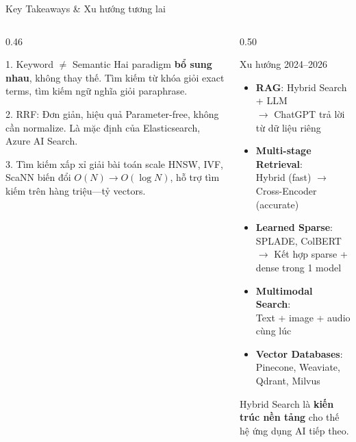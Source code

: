 \documentclass[aspectratio=169, 11pt]{beamer}
\begin{document}
\begin{frame}{Key Takeaways \& Xu hướng tương lai}
\begin{columns}[T]
\begin{column}{0.46\textwidth}

\begin{exampleblock}{1. Keyword $\neq$ Semantic}
{\scriptsize Hai paradigm \textbf{bổ sung nhau}, không thay thế. Tìm kiếm từ khóa giỏi exact terms, tìm kiếm ngữ nghĩa giỏi paraphrase.}
\end{exampleblock}

\vspace{0.05cm}

\begin{exampleblock}{2. RRF: Đơn giản, hiệu quả}
{\scriptsize Parameter-free, không cần normalize. Là mặc định của Elasticsearch, Azure AI Search.}
\end{exampleblock}

\vspace{0.05cm}

\begin{exampleblock}{3. Tìm kiếm xấp xỉ giải bài toán scale}
{\scriptsize HNSW, IVF, ScaNN biến đổi $O(N) \to O(\log N)$, hỗ trợ tìm kiếm trên hàng triệu---tỷ vectors.}
\end{exampleblock}

\end{column}
\begin{column}{0.50\textwidth}

\begin{block}{Xu hướng 2024--2026}
\begin{itemize}
    \item \textbf{RAG}: Hybrid Search + LLM\\
    {\scriptsize$\to$ ChatGPT trả lời từ dữ liệu riêng}
    \item \textbf{Multi-stage Retrieval}:\\
    {\scriptsize Hybrid (fast) $\to$ Cross-Encoder (accurate)}
    \item \textbf{Learned Sparse}: SPLADE, ColBERT\\
    {\scriptsize$\to$ Kết hợp sparse + dense trong 1 model}
    \item \textbf{Multimodal Search}:\\
    {\scriptsize Text + image + audio cùng lúc}
    \item \textbf{Vector Databases}:\\
    {\scriptsize Pinecone, Weaviate, Qdrant, Milvus}
\end{itemize}
\end{block}

\vspace{0.05cm}
{\scriptsize\textcolor{accentTeal}{Hybrid Search là \textbf{kiến trúc nền tảng} cho thế hệ ứng dụng AI tiếp theo.}}

\end{column}
\end{columns}
\end{frame}
\end{document}
